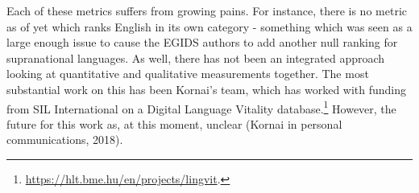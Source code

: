 Each of these metrics suffers from growing pains. For instance, there is no metric as of yet which ranks English in its own category - something which was seen as a large enough issue to cause the EGIDS authors to add another null ranking for supranational languages. %
As well, there has not been an integrated approach looking at quantitative and qualitative measurements together. The most substantial work on this has been Kornai's team, which has worked with funding from SIL International on a Digital Language Vitality database.\footnote{\href{https://hlt.bme.hu/en/projects/lingvit}{https://hlt.bme.hu/en/projects/lingvit}. } However, the future for this work as, at this moment, unclear (Kornai in personal communications, 2018).



